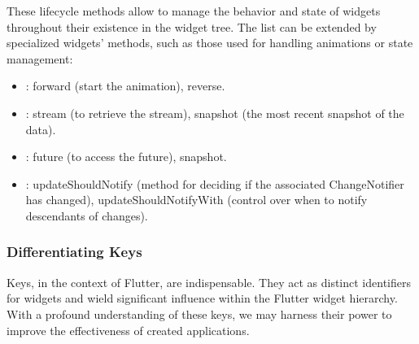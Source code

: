 \noindent These lifecycle methods allow to manage the behavior and state of widgets throughout their existence in the 
widget tree. The list can be extended by specialized widgets' methods, such as those used for handling animations or 
state management: 

\begin{itemize}
  \item {}: forward (start the animation), reverse.
  \item {}: stream (to retrieve the stream), snapshot (the most recent snapshot of the data).
  \item {}: future (to access the future), snapshot.
  \item {}: updateShouldNotify (method for deciding if the associated ChangeNotifier has 
  changed), updateShouldNotifyWith (control over when to notify descendants of changes).
\end{itemize}


\newpage
\subsubsection{Differentiating Keys}

Keys, in the context of Flutter, are indispensable. They act as distinct identifiers for widgets and wield significant 
influence within the Flutter widget hierarchy. With a profound understanding of these keys, we may harness their power 
to improve the effectiveness of created applications.

